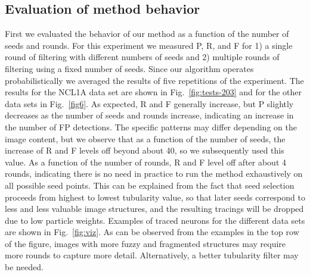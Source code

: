\subsection{Evaluation of method behavior} 
\label{subsec:evaluation-of-method-behavior}
First we evaluated the behavior of our method as a function of the number of seeds and rounds. For this experiment we measured P, R, and F for 1) a single round of filtering with different numbers of seeds and 2) multiple rounds of filtering using a fixed number of seeds. Since our algorithm operates probabilistically we averaged the results of five repetitions of the experiment. The results for the NCL1A data set are shown in Fig.~\ref{fig:tests-203} and for the other data sets in Fig.~\ref{fig6}. As expected, R and F generally increase, but P slightly decreases as the number of seeds and rounds increase, indicating an increase in the number of FP detections. The specific patterns may differ depending on the image content, but we observe that as a function of the number of seeds, the increase of R and F levels off beyond about 40, so we subsequently used this value. As a function of the number of rounds, R and F level off after about 4 rounds, indicating there is no need in practice to run the method exhaustively on all possible seed points. This can be explained from the fact that seed selection proceeds from highest to lowest tubularity value, so that later seeds correspond to less and less valuable image structures, and the resulting tracings will be dropped due to low particle weights. Examples of traced neurons for the different data sets are shown in Fig.~\ref{fig:viz}. As can be observed from the examples in the top row of the figure, images with more fuzzy and fragmented structures may require more rounds to capture more detail. Alternatively, a better tubularity filter may be needed.


